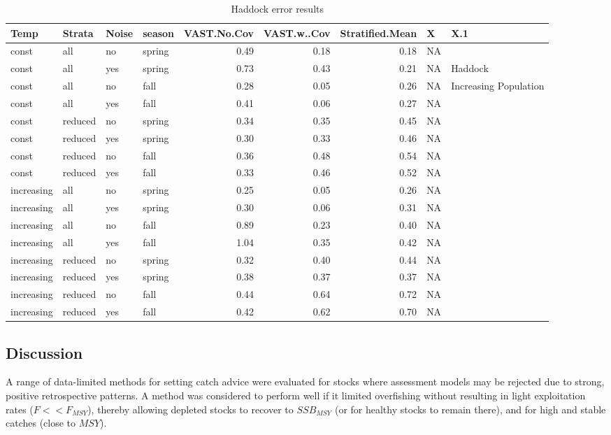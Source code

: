\documentclass[
  12pt,
]{article}
\begin{document}
\begin{table}

\caption{\label{tab:unnamed-chunk-1}Haddock error results}
\centering
\begin{tabular}[t]{l|l|l|l|r|r|r|l|l}
\hline
Temp & Strata & Noise & season & VAST.No.Cov & VAST.w..Cov & Stratified.Mean & X & X.1\\
\hline
const & all & no & spring & 0.49 & 0.18 & 0.18 & NA & \\
\hline
const & all & yes & spring & 0.73 & 0.43 & 0.21 & NA & Haddock\\
\hline
const & all & no & fall & 0.28 & 0.05 & 0.26 & NA & Increasing Population\\
\hline
const & all & yes & fall & 0.41 & 0.06 & 0.27 & NA & \\
\hline
const & reduced & no & spring & 0.34 & 0.35 & 0.45 & NA & \\
\hline
const & reduced & yes & spring & 0.30 & 0.33 & 0.46 & NA & \\
\hline
const & reduced & no & fall & 0.36 & 0.48 & 0.54 & NA & \\
\hline
const & reduced & yes & fall & 0.33 & 0.46 & 0.52 & NA & \\
\hline
increasing & all & no & spring & 0.25 & 0.05 & 0.26 & NA & \\
\hline
increasing & all & yes & spring & 0.30 & 0.06 & 0.31 & NA & \\
\hline
increasing & all & no & fall & 0.89 & 0.23 & 0.40 & NA & \\
\hline
increasing & all & yes & fall & 1.04 & 0.35 & 0.42 & NA & \\
\hline
increasing & reduced & no & spring & 0.32 & 0.40 & 0.44 & NA & \\
\hline
increasing & reduced & yes & spring & 0.38 & 0.37 & 0.37 & NA & \\
\hline
increasing & reduced & no & fall & 0.44 & 0.64 & 0.72 & NA & \\
\hline
increasing & reduced & yes & fall & 0.42 & 0.62 & 0.70 & NA & \\
\hline
\end{tabular}
\end{table}

\hypertarget{discussion}{%
\subsection{Discussion}\label{discussion}}

A range of data-limited methods for setting catch advice were evaluated for stocks where assessment models may be rejected due to strong, positive retrospective patterns. A method was considered to perform well if it limited overfishing without resulting in light exploitation rates (\(F << F_{MSY}\)), thereby allowing depleted stocks to recover to \(SSB_{MSY}\) (or for healthy stocks to remain there), and for high and stable catches (close to \(MSY\)).
\end{document}
